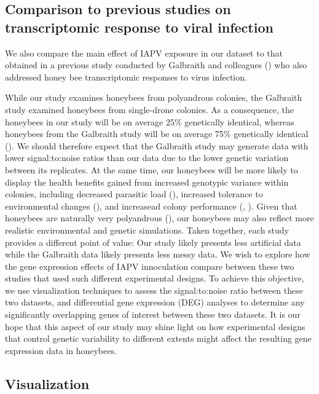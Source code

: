 \documentclass[11pt,a4paper,oldfontcommands,openany]{memoir}
\numberwithin{equation}{section} %
\begin{document}
\subsection{Comparison to previous studies on transcriptomic response to viral infection}

We also compare the main effect of IAPV exposure in our dataset to that obtained in a previous study conducted by Galbraith and colleagues (\citealt{galbraith}) who also addressed honey bee transcriptomic responses to virus infection.

While our study examines honeybees from polyandrous colonies, the Galbraith study examined honeybees from single-drone colonies. As a consequence, the honeybees in our study will be on average 25\% genetically identical, whereas honeybees from the Galbraith study will be on average 75\% genetically identical (\citealt{sisters}). We should therefore expect that the Galbraith study may generate data with lower signal:to:noise ratios than our data due to the lower genetic variation between its replicates. At the same time, our honeybees will be more likely to display the health benefits gained from increased genotypic variance within colonies, including decreased parasitic load (\citealt{multParasite}), increased tolerance to environmental changes (\citealt{divHyp2}), and increasead colony performance (\citealt{geneticDiverse}, \citealt{geneticDiverse2}). Given that honeybees are naturally very polyandrous (\citealt{patriline}), our honeybees may also reflect more realistic environmental and genetic simulations. Taken together, each study provides a different point of value: Our study likely presents less artificial data while the Galbraith data likely presents less messy data. We wish to explore how the gene expression effects of IAPV innoculation compare between these two studies that used such different experimental designs. To achieve this objective, we use visualization techniques to assess the signal:to:noise ratio between these two datasets, and differential gene expression (DEG) analyses to determine any significantly overlapping genes of interest between these two datasets. It is our hope that this aspect of our study may shine light on how experimental designs that control genetic variability to different extents might affect the resulting gene expression data in honeybees.

\subsection{Visualization}
\end{document}
